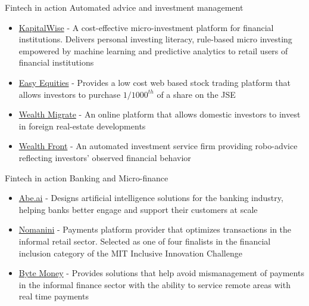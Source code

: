 \documentclass[10pt]{beamer}
\begin{document}

\begin{frame}{Fintech in action}
	Automated advice and investment management
	\begin{itemize}
		\item \href{www.kapitalwise.com/}{KapitalWise} - A cost-effective micro-investment platform for financial institutions. Delivers personal investing literacy, rule-based micro investing empowered by machine learning and predictive analytics to retail users of financial institutions
		\item \href{https://www.easyequities.co.za}{Easy Equities} - Provides a low cost web based stock trading platform that allows investors to purchase $1/1000^{th}$ of a share on the JSE
		\item \href{https://www.wealthmigrate.com/za}{Wealth Migrate} - An online platform that allows domestic investors to invest in foreign real-estate developments
		\item \href{https://www.wealthfront.com}{Wealth Front} - An automated investment service firm providing robo-advice reflecting investors' observed financial behavior
	\end{itemize}
\end{frame}


\begin{frame}{Fintech in action}
	Banking and Micro-finance
	\begin{itemize}
		\item \href{https://www.abe.ai/}{Abe.ai} - Designs artificial intelligence solutions for the banking industry, helping banks better engage and support their customers at scale
		\item \href{https://www.nomanini.com/}{Nomanini} - Payments platform provider that optimizes transactions in the informal retail sector. Selected as one of four finalists in the financial inclusion category of the MIT Inclusive Innovation Challenge
		\item\href{www.bytemoney.co.za/}{Byte Money} - Provides solutions that help avoid mismanagement of payments in the informal finance sector with the ability to service remote areas with real time payments
	\end{itemize}
\end{frame}

\end{document}
